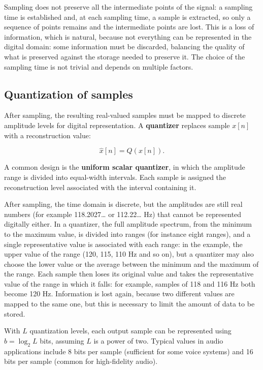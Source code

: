 \documentclass[11pt,a4paper,openany]{report}
\begin{document}
Sampling does not preserve all the intermediate points of the signal: a sampling time is established and, at each sampling time, a sample is extracted, so only a sequence of points remains and the intermediate points are lost. This is a loss of information, which is natural, because not everything can be represented in the digital domain: some information must be discarded, balancing the quality of what is preserved against the storage needed to preserve it. The choice of the sampling time is not trivial and depends on multiple factors.
\subsection{Quantization of samples}

After sampling, the resulting real-valued samples must be mapped to discrete amplitude levels for digital representation. A \textbf{quantizer} replaces sample $x[n]$ with a reconstruction value:

\[ \hat{x}[n] = Q(x[n]). \]

A common design is the \textbf{uniform scalar quantizer}, in which the amplitude range is divided into equal-width intervals. Each sample is assigned the reconstruction level associated with the interval containing it.

After sampling, the time domain is discrete, but the amplitudes are still real numbers (for example 118.2027\ldots{} or 112.22\ldots{} Hz) that cannot be represented digitally either. In a quantizer, the full amplitude spectrum, from the minimum to the maximum value, is divided into ranges (for instance eight ranges), and a single representative value is associated with each range: in the example, the upper value of the range (120, 115, 110 Hz and so on), but a quantizer may also choose the lower value or the average between the minimum and the maximum of the range. Each sample then loses its original value and takes the representative value of the range in which it falls: for example, samples of 118 and 116 Hz both become 120 Hz. Information is lost again, because two different values are mapped to the same one, but this is necessary to limit the amount of data to be stored.

With $L$ quantization levels, each output sample can be represented using $b = \log_2 L$ bits, assuming $L$ is a power of two. Typical values in audio applications include 8 bits per sample (sufficient for some voice systems) and 16 bits per sample (common for high-fidelity audio).
\end{document}
